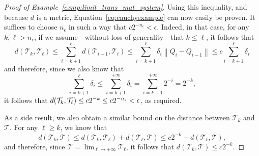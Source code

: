 \documentclass[10pt,a4paper]{paper}
\theoremstyle{definition}
\newcommand{\norm}[1]{\left\lVert #1 \right\rVert}
\begin{document}
\begin{proof}[Proof of Example~\ref{exmp:limit_trans_mat_system}]
Using this inequality, and because $d$ is a metric, Equation~\eqref{eq:cauchyexample} can now easily be proven. It suffices to choose $n_\epsilon$ in such a way that $c2^{-n_\epsilon}<\epsilon$. Indeed, in that case, for any $k,\ell>n_\epsilon$, if we assume---without loss of generality---that $k\leq\ell$, it follows that
 \begin{equation*}
d(\mathcal{T}_{k},\mathcal{T}_\ell)
\leq\sum_{i=k+1}^{\ell}d(\mathcal{T}_{i-1},\mathcal{T}_i)
\leq\sum_{i=k+1}^{\ell}\delta_i\norm{Q_i-Q_{i-1}}
\leq c\sum_{i=k+1}^{\ell}\delta_i
 \end{equation*}
and therefore, since we also know that
\begin{equation*}
\sum_{i=k+1}^{\ell}\delta_i
\leq
\sum_{i=k+1}^{+\infty}\delta_i
=\sum_{i=k+1}^{+\infty}2^{-i}
=2^{-k},
\end{equation*}
it follows that $\smash{d(\mathcal{T}_{k},\mathcal{T}_\ell)\leq c 2^{-k}\leq c 2^{-n_\epsilon}}<\epsilon$, as required.

As a side result, we also obtain a similar bound on the distance between $\mathcal{T}_k$ and $\mathcal{T}$. For any $\ell\geq k$, we know that
\begin{equation*}
d(\mathcal{T}_k,\mathcal{T})
\leq d(\mathcal{T}_k,\mathcal{T}_\ell)+d(\mathcal{T}_\ell,\mathcal{T})\leq c 2^{-k}+d(\mathcal{T}_\ell,\mathcal{T}),
\end{equation*}
and therefore, since $\mathcal{T}=\lim_{\ell\to+\infty}\mathcal{T}_\ell$, it follows that $d(\mathcal{T}_k,\mathcal{T})\leq c 2^{-k}$.
\end{proof}
\end{document}
